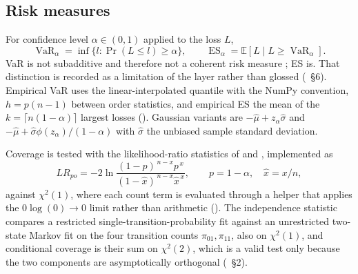 \documentclass[11pt,a4paper]{article}
\begin{document}
\subsection{Risk measures}
For confidence level $\alpha \in (0,1)$ applied to the loss $L$,
\begin{equation}
\operatorname{VaR}_\alpha = \inf\{l : \Pr(L \le l) \ge \alpha\}, \qquad
\operatorname{ES}_\alpha = \mathbb{E}[L \mid L \ge \operatorname{VaR}_\alpha].
\end{equation}
VaR is not subadditive and therefore not a coherent risk measure \citep{artzner1999coherent};
ES is. That distinction is recorded as a limitation of the layer rather than glossed
(~\S6). Empirical VaR uses the linear-interpolated
quantile with the NumPy  convention, $h = p(n-1)$ between order
statistics, and empirical ES the mean of the $k = \lceil n(1-\alpha) \rceil$ largest losses
(). Gaussian variants are
$-\hat\mu + z_\alpha \hat\sigma$ and $-\hat\mu + \hat\sigma \phi(z_\alpha)/(1-\alpha)$ with
$\hat\sigma$ the unbiased sample standard deviation.

Coverage is tested with the likelihood-ratio statistics of \citet{kupiec1995performance} and
\citet{christoffersen2003elements}, implemented as
\begin{equation}
LR_{po} = -2 \ln \frac{(1-p)^{\,n-x} p^{\,x}}{(1-\hat{x})^{\,n-x} \hat{x}^{\,x}},
\qquad p = 1-\alpha, \quad \hat{x} = x/n,
\end{equation}
against $\chi^2(1)$, where each count term is evaluated through a helper that applies the
$0 \log(0) \to 0$ limit rather than arithmetic (). The
independence statistic compares a restricted single-transition-probability fit against an
unrestricted two-state Markov fit on the four transition counts $\pi_{01}, \pi_{11}$, also on
$\chi^2(1)$, and conditional coverage is their sum on $\chi^2(2)$, which is a valid test only
because the two components are asymptotically orthogonal
(~\S2).
\end{document}
